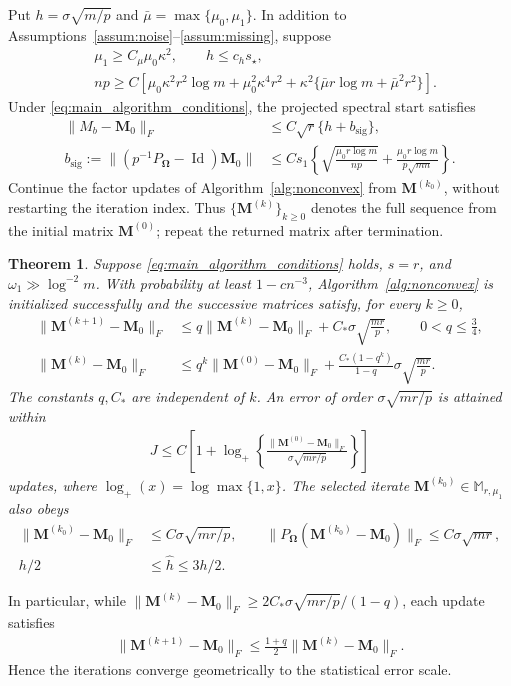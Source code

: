 \documentclass[numsec,webpdf,modern,large,namedate]{oup-authoring-template}
\theoremstyle{plain}
\newtheorem{theorem}{Theorem}[section]
\theoremstyle{remark}
\newcommand{\M}{\bm{M}}
\newcommand{\bOmega}{\bm{\Omega}}
\newif\ifmarkchanges
\newenvironment{revision}{\begingroup\ifmarkchanges\color{red}\fi}{\endgroup}
\begin{document}
\begin{revision}
Put $h=\sigma\sqrt{m/p}$ and $\bar\mu=\max\{\mu_0,\mu_1\}$.
In addition to Assumptions~\ref{assum:noise}--\ref{assum:missing}, suppose
\begin{align}
 &\mu_1\ge C_\mu\mu_0\kappa^2,\qquad h\le c_hs_\star,\nonumber\\
 &np\ge C\left[\mu_0\kappa^2r^2\log m+\mu_0^2\kappa^4r^2
           +\kappa^2\{\bar\mu r\log m+\bar\mu^2r^2\}\right].
 \label{eq:main_algorithm_conditions}
\end{align}
Under \eqref{eq:main_algorithm_conditions}, the projected spectral start satisfies
\begin{align}
 \|M_b-\M_0\|_F&\le C\sqrt r\{h+b_{\mathrm{sig}}\},\nonumber\\
 b_{\mathrm{sig}}:=\|(p^{-1}P_{\bOmega}-\operatorname{Id})\M_0\|
 &\le Cs_1\left\{\sqrt{\frac{\mu_0r\log m}{np}}
             +\frac{\mu_0r\log m}{p\sqrt{mn}}\right\}.
 \label{eq:main_spectral_start_accuracy}
\end{align}
Continue the factor updates of Algorithm~\ref{alg:nonconvex} from
$\M^{(k_0)}$, without restarting the iteration index. Thus
$\{\M^{(k)}\}_{k\ge0}$ denotes the full sequence from the initial matrix
$\M^{(0)}$; repeat the returned matrix after termination.

\begin{theorem}
\label{thm:track_interation}
Suppose \eqref{eq:main_algorithm_conditions} holds, $s=r$, and
$\omega_1\gg\log^{-2}m$. With probability at least $1-cn^{-3}$,
Algorithm~\ref{alg:nonconvex} is initialized successfully and the
successive matrices satisfy, for every $k\ge0$,
\begin{align}
 \|\M^{(k+1)}-\M_0\|_F
 &\le q\|\M^{(k)}-\M_0\|_F+C_*\sigma\sqrt{\frac{mr}{p}},
 \qquad 0<q\le\frac34,\label{eq:main_uniform_contraction}\\
 \|\M^{(k)}-\M_0\|_F
 &\le q^k\|\M^{(0)}-\M_0\|_F
       +\frac{C_*(1-q^k)}{1-q}\sigma\sqrt{\frac{mr}{p}}.
 \label{eq:main_geometric_recovery}
\end{align}
The constants $q,C_*$ are independent of $k$. An error of order
$\sigma\sqrt{mr/p}$ is attained within
\begin{align}
 J\le C\left[1+\log_+\left\{
       \frac{\|\M^{(0)}-\M_0\|_F}{\sigma\sqrt{mr/p}}\right\}\right]
 \label{eq:main_recovery_complexity}
\end{align}
updates, where $\log_+(x)=\log\max\{1,x\}$.
The selected iterate $\M^{(k_0)}\in\mathbb M_{r,\mu_1}$ also obeys
\begin{align*}
 \|\M^{(k_0)}-\M_0\|_F&\le C\sigma\sqrt{mr/p},\qquad
 \|P_{\bOmega}(\M^{(k_0)}-\M_0)\|_F\le C\sigma\sqrt{mr},\\
 h/2&\le\widehat h\le3h/2.
\end{align*}
\end{theorem}
In particular, while $\|\M^{(k)}-\M_0\|_F\ge
2C_*\sigma\sqrt{mr/p}/(1-q)$, each update satisfies
\begin{align}
 \|\M^{(k+1)}-\M_0\|_F
 \le\frac{1+q}{2}\|\M^{(k)}-\M_0\|_F.
 \label{eq:main_linear_above_floor}
\end{align}
Hence the iterations converge geometrically to the statistical error scale.


\end{revision}
\end{document}
